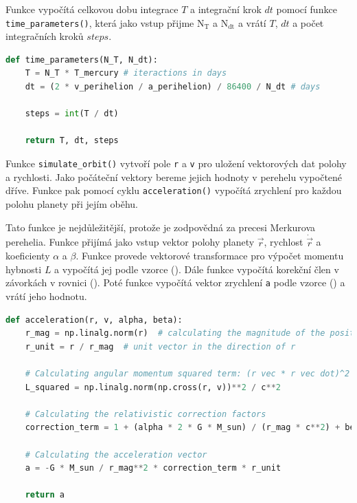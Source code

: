 \documentclass[a4paper,11pt,twocolumn]{article}
\begin{document}
            Funkce vypočítá celkovou dobu integrace $T$ a integrační krok $dt$ pomocí funkce \texttt{time\_parameters()}, která jako vstup přijme $\text{N}_\text{T}$ a $\text{N}_\text{dt}$ a vrátí $T$, $dt$ a počet integračních kroků $steps$. 

\begin{lstlisting}[language=Python, caption={Parametry integrace}]
def time_parameters(N_T, N_dt):
    T = N_T * T_mercury # iteractions in days
    dt = (2 * v_perihelion / a_perihelion) / 86400 / N_dt # days

    steps = int(T / dt)
    
    return T, dt, steps
\end{lstlisting}

            Funkce \texttt{simulate\_orbit()} vytvoří pole \texttt{r} a \texttt{v} pro uložení vektorových dat polohy a rychlosti. Jako počáteční vektory bereme jejich hodnoty v perehelu vypočtené dříve. Funkce pak pomocí cyklu \texttt{acceleration()} vypočítá zrychlení pro každou polohu planety při jejím oběhu. 

            Tato funkce je nejdůležitější, protože je zodpovědná za precesi Merkurova perehelia. Funkce přijímá jako vstup vektor polohy planety $\vec{r}$, rychlost $\dot{\vec{r}}$ a koeficienty $\alpha$ a $\beta$. Funkce provede vektorové transformace pro výpočet momentu hybnosti $L$ a vypočítá jej podle vzorce (). Dále funkce vypočítá korekční člen v závorkách v rovnici (). Poté funkce vypočítá vektor zrychlení \texttt{a} podle vzorce () a vrátí jeho hodnotu.

\begin{lstlisting}[language=Python, caption={Výpočet zrychlení}]
def acceleration(r, v, alpha, beta):
    r_mag = np.linalg.norm(r)  # calculating the magnitude of the position vector
    r_unit = r / r_mag  # unit vector in the direction of r
    
    # Calculating angular momentum squared term: (r vec * r vec dot)^2 / c^2
    L_squared = np.linalg.norm(np.cross(r, v))**2 / c**2
    
    # Calculating the relativistic correction factors
    correction_term = 1 + (alpha * 2 * G * M_sun) / (r_mag * c**2) + beta * L_squared / r_mag**2
    
    # Calculating the acceleration vector
    a = -G * M_sun / r_mag**2 * correction_term * r_unit
    
    return a 
\end{lstlisting}
\end{document}
